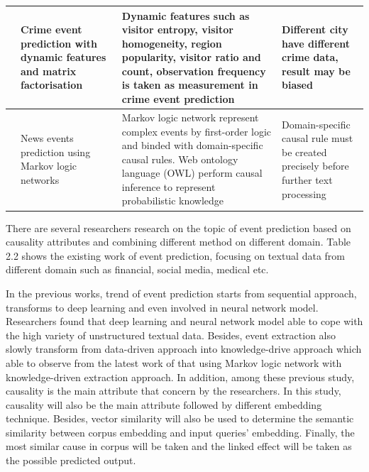\documentclass[twoside]{utmthesis}
\begin{document}
\begin{table}[]
{\begin{tabular}{|p{3cm}|p{3cm}|p{5cm}|p{4cm}|}
			\hline
			\citep{rumi2018crime} & Crime event prediction with dynamic features and matrix factorisation   & Dynamic features such as visitor entropy, visitor homogeneity, region popularity, visitor ratio and count, observation frequency is taken as measurement in crime event prediction & Different city have different crime data, result may be biased \\
			\hline
			\citep{dami2018news}   & News events prediction using Markov logic networks & Markov logic network represent complex events by first-order logic and binded with domain-specific causal rules. Web ontology language (OWL) perform causal inference to represent probabilistic knowledge & Domain-specific causal rule must be created precisely before further text processing \\     
			\hline                                                                                                 
	\end{tabular}}
\end{table}

There are several researchers research on the topic 
of event prediction based on causality attributes and combining different method on different domain. Table 2.2 shows the existing work of event prediction, focusing on textual data from different domain such as financial, social media, medical etc. 

In the previous works, trend of event prediction starts from sequential approach, transforms to deep learning and even involved in neural network model. Researchers found that deep learning and neural network model able to cope with the high variety of unstructured textual data. Besides, event extraction also slowly transform from data-driven approach into knowledge-drive approach which able to observe from the latest work of \cite{dami2018news} that using Markov logic network with knowledge-driven extraction approach. In addition, among these previous study, causality is the main attribute that concern by the researchers. In this study, causality will also be the main attribute followed by different embedding technique. Besides, vector similarity will also be used to determine the semantic similarity between corpus embedding and input queries' embedding. Finally, the most similar cause in corpus will be taken and the linked effect will be taken as the possible predicted output.
\end{document}
